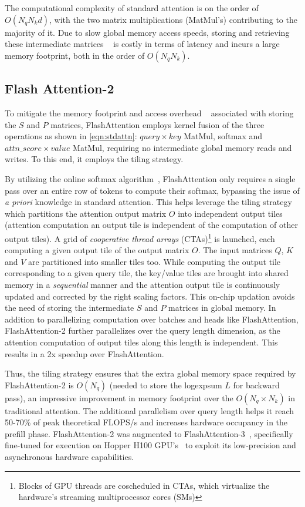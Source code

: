 The computational complexity of standard attention is on the order of $O(N_q N_k d)$, with the two matrix multiplications (MatMul's) contributing to the majority of it. Due to slow global memory access speeds, storing and retrieving these intermediate matrices ~\cite{ivanov2021data} is costly in terms of latency and incurs a large memory footprint, both in the order of $O(N_q N_k)$. 

\subsection{Flash Attention-2}
\label{subsec:FA2background}
To mitigate the memory footprint and access overhead ~\cite{ivanov2021data} associated with storing the $S$ and $P$ matrices, FlashAttention employs kernel fusion of the three operations as shown in \autoref{eqn:stdattn}: $query \times key$ MatMul, softmax and $attn\_score \times value$ MatMul, requiring no intermediate global memory reads and writes. To this end, it employs the tiling strategy.

By utilizing the online softmax algorithm~\cite{milakov2018online}, FlashAttention only requires a single pass over an entire row of tokens to compute their softmax, bypassing the issue of \textit{a priori} knowledge in standard attention. This helps leverage the tiling strategy which partitions the attention output matrix $O$ into independent output tiles (attention computation an output tile is independent of the computation of other output tiles). A grid of \textit{cooperative thread arrays} (CTAs)\footnote{Blocks of GPU threads are coscheduled in CTAs, which virtualize the hardware's streaming multiprocessor cores (SMs)} is launched, each computing a given output tile of the output matrix $O$. The input matrices $Q$, $K$ and $V$ are partitioned into smaller tiles too. While computing the output tile corresponding to a given query tile, the key/value tiles are brought into shared memory in a \textit{sequential} manner and the attention output tile is continuously updated and corrected by the right scaling factors. This on-chip updation avoids the need of storing the intermediate $S$ and $P$ matrices in global memory. In addition to parallelizing computation over batches and heads like FlashAttention, FlashAttention-2 further parallelizes over the query length dimension, as the attention computation of output tiles along this length is independent. This results in a 2x speedup over FlashAttention.

Thus, the tiling strategy ensures that the extra global memory space required by FlashAttention-2 is $O(N_q)$ (needed to store the logexpsum $L$ for backward pass), an impressive improvement in memory footprint over the $O(N_q \times N_k)$ in traditional attention. The additional parallelism over query length helps it reach 50-70\% of peak theoretical FLOPS/s and increases hardware occupancy in the prefill phase. FlashAttention-2 was augmented to FlashAttention-3~\cite{flashattention3}, specifically fine-tuned for execution on Hopper H100 GPU's~\cite{luo2024benchmarkingdissectingnvidiahopper} to exploit its low-precision and asynchronous hardware capabilities. 

